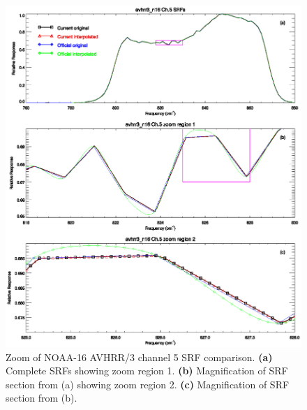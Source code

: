 \begin{figure}[htp]
  \centering
  \includegraphics[scale=1]{graphics/zoom/avhrr3_n16.ch5.srf.zoom.eps}
  \caption{Zoom of NOAA-16 AVHRR/3 channel 5 SRF comparison. \textbf{(a)} Complete SRFs showing zoom region 1. \textbf{(b)} Magnification of SRF section from (a) showing zoom region 2.  \textbf{(c)} Magnification of SRF section from (b).}
  \label{fig:avhrr3_n16.ch5.srf.zoom}
\end{figure}

